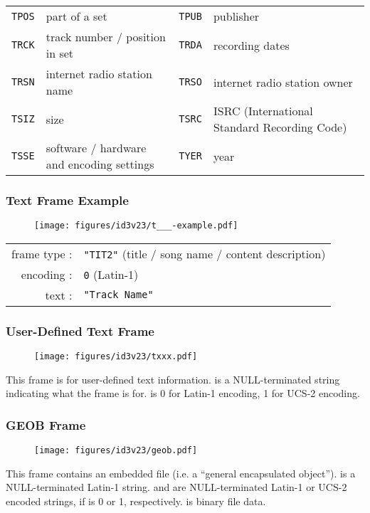 \begin{table}[h]
{\begin{tabular}{|c|l||c|l|}
      \texttt{TPOS} & part of a set &
      \texttt{TPUB} & publisher \\
      \texttt{TRCK} & track number / position in set &
      \texttt{TRDA} & recording dates \\
      \texttt{TRSN} & internet radio station name &
      \texttt{TRSO} & internet radio station owner \\
      \texttt{TSIZ} & size &
      \texttt{TSRC} & ISRC (International Standard Recording Code) \\
      \texttt{TSSE} & software / hardware and encoding settings &
      \texttt{TYER} & year \\
      \hline
    \end{tabular}
  }
\end{table}

\subsubsection{Text Frame Example}
\begin{figure}[h]
  \texttt{[image: figures/id3v23/t\_\_\_-example.pdf]}
\end{figure}
\par
\noindent
\begin{tabular}{rl}
frame type : & \texttt{"TIT2"} (title / song name / content description) \\
encoding : & \texttt{0} (Latin-1) \\
text : & \texttt{"Track Name"} \\
\end{tabular}

\clearpage

\subsubsection{User-Defined Text Frame}

\begin{figure}[h]
  \texttt{[image: figures/id3v23/txxx.pdf]}
\end{figure}
\par
\noindent
This frame is for user-defined text information.
 is a NULL-terminated string indicating
what the frame is for.
 is 0 for Latin-1 encoding, 1 for UCS-2 encoding.

\subsubsection{GEOB Frame}
\begin{figure}[h]
\texttt{[image: figures/id3v23/geob.pdf]}
\end{figure}
This frame contains an embedded file (i.e. a ``general encapsulated object'').
 is a NULL-terminated Latin-1 string.
 and  are NULL-terminated
Latin-1 or UCS-2 encoded strings, if  is 0 or 1,
respectively.
 is binary file data.

